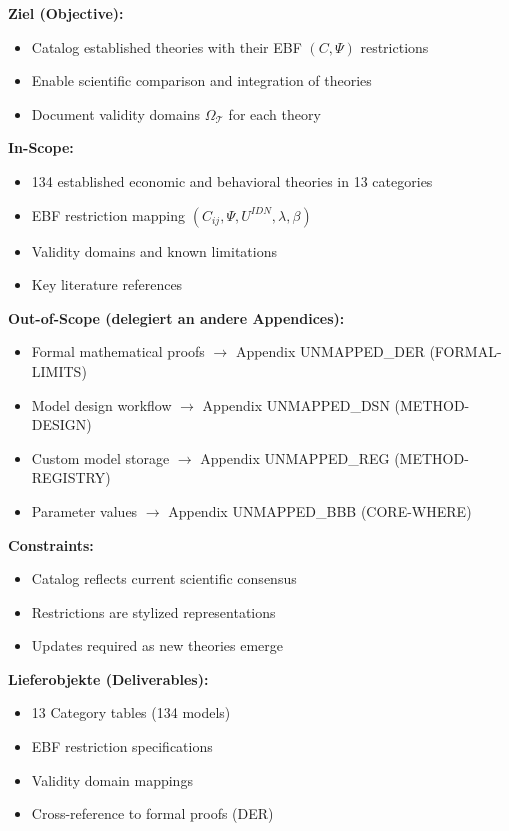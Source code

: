 \begin{tcolorbox}[
    colback=orange!5!white,
    colframe=orange!75!black,
    title={\textbf{Appendix Scope: Ziel / In-Scope / Out-of-Scope / Constraints}},
    fonttitle=\bfseries
]

\textbf{Ziel (Objective):}
\begin{itemize}[nosep]
    \item Catalog established theories with their EBF $(C, \Psi)$ restrictions
    \item Enable scientific comparison and integration of theories
    \item Document validity domains $\Omega_\mathcal{T}$ for each theory
\end{itemize}

\textbf{In-Scope:}
\begin{itemize}[nosep]
    \item 134 established economic and behavioral theories in 13 categories
    \item EBF restriction mapping $(C_{ij}, \Psi, U^{IDN}, \lambda, \beta)$
    \item Validity domains and known limitations
    \item Key literature references
\end{itemize}

\textbf{Out-of-Scope (delegiert an andere Appendices):}
\begin{itemize}[nosep]
    \item Formal mathematical proofs $\rightarrow$ Appendix UNMAPPED_DER (FORMAL-LIMITS)
    \item Model design workflow $\rightarrow$ Appendix UNMAPPED_DSN (METHOD-DESIGN)
    \item Custom model storage $\rightarrow$ Appendix UNMAPPED_REG (METHOD-REGISTRY)
    \item Parameter values $\rightarrow$ Appendix UNMAPPED_BBB (CORE-WHERE)
\end{itemize}

\textbf{Constraints:}
\begin{itemize}[nosep]
    \item Catalog reflects current scientific consensus
    \item Restrictions are stylized representations
    \item Updates required as new theories emerge
\end{itemize}

\textbf{Lieferobjekte (Deliverables):}
\begin{itemize}[nosep]
    \item 13 Category tables (134 models)
    \item EBF restriction specifications
    \item Validity domain mappings
    \item Cross-reference to formal proofs (DER)
\end{itemize}

\end{tcolorbox}

